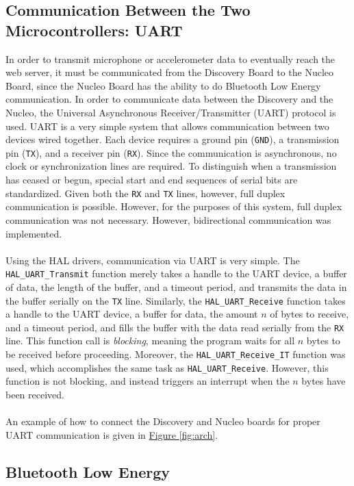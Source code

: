 \subsection{Communication Between the Two Microcontrollers: UART}
In order to transmit microphone or accelerometer data to eventually reach the web server, it must be
communicated from the Discovery Board to the Nucleo Board, since the Nucleo Board has the ability to
do Bluetooth Low Energy communication. In order to communicate data between the Discovery and the
Nucleo, the Universal Asynchronous Receiver/Transmitter (UART) protocol is used. UART is a very
simple system that allows communication between two devices wired together. Each device requires a
ground pin (\texttt{GND}), a transmission pin (\texttt{TX}), and a receiver pin (\texttt{RX}). Since
the communication is asynchronous, no clock or synchronization lines are required. To distinguish
when a transmission has ceased or begun, special start and end sequences of serial bits are
standardized. Given both the \texttt{RX} and \texttt{TX} lines, however, full duplex communication
is possible. However, for the purposes of this system, full duplex communication was not necessary.
However, bidirectional communication was implemented.\\\\
Using the HAL drivers, communication via UART is very simple. The \texttt{HAL\_UART\_Transmit}
function merely takes a handle to the UART device, a buffer of data, the length of the buffer, and a
timeout period, and transmits the data in the buffer serially on the \texttt{TX} line. Similarly, the
\texttt{HAL\_UART\_Receive} function takes a handle to the UART device, a buffer for data, the
amount $n$ of bytes to receive, and a
timeout period, and fills the buffer with the data read serially from the \texttt{RX} line. This
function call is \textit{blocking}, meaning the program waits for all $n$ bytes to be received before
proceeding. Moreover, the \texttt{HAL\_UART\_Receive\_IT} function was used, which accomplishes the
same task as \texttt{HAL\_UART\_Receive}. However, this function is not blocking, and instead
triggers an interrupt when the $n$ bytes have been received.\\\\
An example of how to connect the Discovery and Nucleo boards for proper UART communication is given
in \hyperref[fig:systemarch]{Figure \ref{fig:arch}}.
\subsection{Bluetooth Low Energy}

